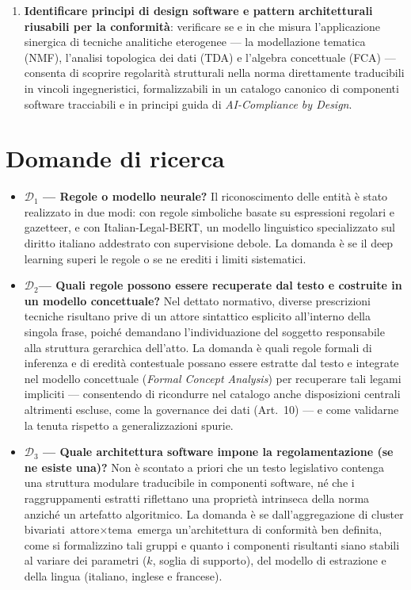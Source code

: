 \documentclass[12pt,a4paper,oneside]{report}
\begin{document}
\begin{enumerate}
\item \textbf{Identificare principi di design software e pattern architetturali riusabili per la conformità}: verificare se e in che misura l'applicazione sinergica di tecniche analitiche eterogenee — la modellazione tematica (NMF), l'analisi topologica dei dati (TDA) e l'algebra concettuale (FCA) — consenta di scoprire regolarità strutturali nella norma direttamente traducibili in vincoli ingegneristici, formalizzabili in un catalogo canonico di componenti software tracciabili e in principi guida di \emph{AI-Compliance by Design}.
\end{enumerate}


\section{Domande di ricerca}
\label{sec:domande}
\begin{itemize}
    \item \textbf{$\mathcal{D}_1$ --- Regole o modello neurale?}
    Il riconoscimento delle entità è stato realizzato in due modi: con regole simboliche basate su espressioni regolari e gazetteer, e con Italian-Legal-BERT, un modello linguistico specializzato sul diritto italiano addestrato con supervisione debole. La domanda è se il deep learning superi le regole o se ne erediti i limiti sistematici.
    \item \textbf{$\mathcal{D}_2$--- Quali regole possono essere recuperate dal testo e costruite in un modello concettuale?} Nel dettato normativo, diverse prescrizioni tecniche risultano prive di un attore sintattico esplicito all'interno della singola frase, poiché demandano l'individuazione del soggetto responsabile alla struttura gerarchica dell'atto. La domanda è quali regole formali di inferenza e di eredità contestuale possano essere estratte dal testo e integrate nel modello concettuale (\emph{Formal Concept Analysis}) per recuperare tali legami impliciti --- consentendo di ricondurre nel catalogo anche disposizioni centrali altrimenti escluse, come la governance dei dati (Art.~10) --- e come validarne la tenuta rispetto a generalizzazioni spurie.
    \item \textbf{$\mathcal{D}_3$ --- Quale architettura software impone la regolamentazione (se ne esiste una)?} Non è scontato a priori che un testo legislativo contenga una struttura modulare traducibile in componenti software, né che i raggruppamenti estratti riflettano una proprietà intrinseca della norma anziché un artefatto algoritmico. La domanda è se dall'aggregazione di cluster bivariati $\text{attore} \times \text{tema}$ emerga un'architettura di conformità ben definita, come si formalizzino tali gruppi e quanto i componenti risultanti siano stabili al variare dei parametri ($k$, soglia di supporto), del modello di estrazione e della lingua (italiano, inglese e francese).
\end{itemize}
\end{document}

